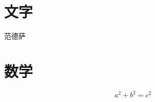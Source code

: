 \documentclass[UTF8]{ctexart}
\begin{document}
\section{文字}
范德萨

\section{数学}
\[
	a^2 + b^2 = c^2
\]
\end{document}
